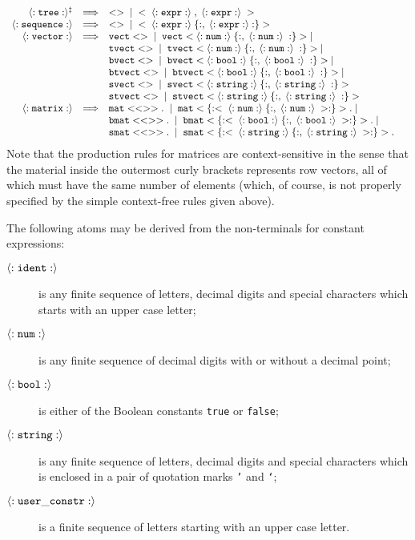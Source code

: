 $$
\begin{array}{rcll}
{\tt \langle:tree:\rangle ^\ddagger} & \Longrightarrow & {\tt <>\;} \;|\; {\tt \;
<\;\langle:expr:\rangle\;,\;\langle:expr:\rangle\;>} &\\
{\tt \langle:sequence:\rangle} & \Longrightarrow & {\tt <>\;} \;|\; {\tt \;
<\;\langle:expr:\rangle\;\{:,\;\langle:expr:\rangle:\}>} &\\
{\tt \langle:vector:\rangle} & \Longrightarrow & {\tt vect<>\;} \;|\; {\tt \;
vect<\langle:num:\rangle\;\{:,\;\langle:num:\rangle\;:\}>} \;|\;\\
& & {\tt tvect<>\;} \;|\; {\tt \;tvect<\langle:num:\rangle\;\{:,\;\langle:num:\rangle\;:\}>} \;|\;\\
& & {\tt bvect<>\;} \;|\; {\tt \;bvect<\langle:bool:\rangle\;\{:,\;\langle:bool:\rangle\;:\}>} \;|\;\\
& & {\tt btvect<>\;} \;|\; {\tt \;btvect<\langle:bool:\rangle\;\{:,\;\langle:bool:\rangle\;:\}>} \;|\;\\
& & {\tt svect<>\;} \;|\; {\tt \;svect<\langle:string:\rangle\;\{:,\;\langle:string:\rangle\;:\}>} &\\
& & {\tt stvect<>\;} \;|\; {\tt \;stvect<\langle:string:\rangle\;\{:,\;\langle:string:\rangle\;:\}>} &\\
{\tt \langle:matrix:\rangle} & \Longrightarrow & 
{\tt mat<<>>.\;} \;|\; {\tt \; mat<\{:<\;\langle:num:\rangle\;\{:,\;\langle:num:\rangle\;>:\}>.} \;|\;\\
& & {\tt bmat<<>>.\;} \;|\; {\tt \; bmat<\{:<\;\langle:bool:\rangle\;\{:,\;\langle:bool:\rangle\;>:\}>.} \;|\;\\
& & {\tt smat<<>>.\;} \;|\; {\tt \; smat<\{:<\;\langle:string:\rangle\;\{:,\;\langle:string:\rangle\;>:\}>.} \\
\end{array}
$$
Note that the production rules for matrices are context-sensitive
 in the sense that the material inside the outermost curly brackets
 represents row vectors,  all of which must have the {\mys same}
 number of elements (which, of course, is not properly specified by
 the simple context-free rules given above).

The following {\mys atoms} may be derived from the non-terminals for
 constant expressions: 
\begin{description}
\item[${\tt \langle:ident:\rangle}$] is any finite sequence of letters, decimal
digits and special characters
which starts with an upper case letter;
\item[${\tt \langle:num:\rangle}$] is any finite sequence of decimal digits with
or without a decimal point;
\item[${\tt \langle:bool:\rangle}$] is either of the Boolean constants {\tt true}
or {\tt false};
\item[${\tt \langle:string:\rangle}$] is any finite sequence of letters, decimal
digits and special characters which is enclosed in a pair of quotation marks {\tt '} and {\tt `};
\item[${\tt \langle:user\_constr:\rangle}$] is a finite sequence of letters starting with an upper case letter.
\end{description}

